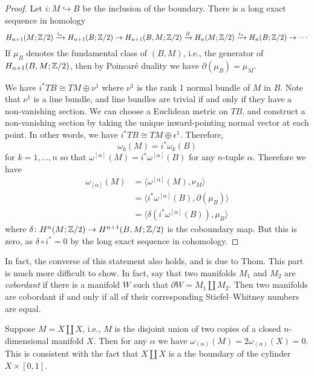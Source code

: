 \documentclass[ma3408.tex]{subfiles}
\begin{document}
\begin{proof}
Let $i \colon M \hookrightarrow B$ be the inclusion of the boundary. There is a long exact sequence in homology 
\[
H_{n+1}(M;\mathbb{Z}/2) \xrightarrow{i_*} H_{n+1}(B;\mathbb{Z}/2) \to H_{n+1}(B,M;\mathbb{Z}/2) \xrightarrow{\partial} H_n(M;\mathbb{Z}/2)\xrightarrow{i_*} H_{n}(B;\mathbb{Z}/2) \to \cdots 
\]
If $\mu_B$ denotes the fundamental class of $(B,M)$, i.e., the generator of $H_{n+1}(B,M;\mathbb{Z}/2) $, then by Poincar\'{e} duality we have $\partial(\mu_B) = \mu_M$. 


We have $i^*TB \cong TM \oplus \nu^1$ where $\nu^1$ is the rank 1 normal bundle of $M$ in $B$. Note that $\nu^1$ is a line bundle, and line bundles are trivial if and only if they have a non-vanishing section. We can choose a Euclidean metric on $TB$, and construct a non-vanishing section by taking the unique inward-pointing normal vector at each point. In other words, we have $i^*TB \cong TM \oplus \epsilon^1$. Therefore, 
\[
\omega_k(M) = i^*\omega_k(B)
\]
for $k = 1,\ldots,n$ so that $\omega^{[\alpha]}(M) = i^*\omega^{[\alpha]}(B)$ for any $n$-tuple $\alpha$. Therefore we have
\begin{align*}
\omega_{[\alpha]}(M) &= \langle \omega^{[\alpha]}(M),\nu_M \rangle \\
&= \langle i^*\omega^{[\alpha]}(B), \partial(\mu_B) \rangle \\ 
&=  \langle \delta(i^*\omega^{[\alpha]}(B)),\mu_B \rangle 
\end{align*}
where $\delta \colon H^n(M;\mathbb{Z}/2) \to H^{n+1}(B,M;\mathbb{Z}/2)$ is the coboundary map. But this is zero, as $\delta \circ i^* = 0$ by the long exact sequence in cohomology. 
\end{proof}
\begin{Rem}\label{rem:thom-theorem}
In fact, the converse of this statement also holds, and is due to Thom. This part is much more difficult to show. In fact, say that two manifolds $M_1$ and $M_2$ are \emph{cobordant} if there is a manifold $W$ such that $\partial W = M_1 \coprod M_2$. Then two manifolds are cobordant if and only if all of their corresponding Stiefel--Whitney numbers are equal. 
\end{Rem}
\begin{Exa}
Suppose $M = X \coprod X$, i.e., $M$ is the disjoint union of two copies of a closed $n$-dimensional manifold $X$. Then for any $\alpha$ we have $\omega_{(\alpha)}(M) = 2\omega_{(\alpha)}(X) = 0$. This is consistent with the fact that $X \coprod X$ is a the boundary of the cylinder $X \times [0,1]$. 
\end{Exa}
\end{document}
